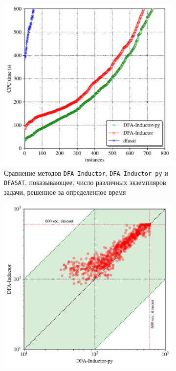 \begin{figure}[ht]
  \centering
  \begin{subfigure}[b]{0.48\textwidth}
    \centering
    \includegraphics[width=\textwidth]{img/lata19/plots/cactus}
    \caption{Сравнение методов \texttt{DFA-Inductor}, \texttt{DFA-Inductor-py} и \texttt{DFASAT}, показывающее, число различных экземпляров задачи, решенное за определенное время}
    \label{img:plots:cactus}
  \end{subfigure}%
  \;\;
  \begin{subfigure}[b]{0.48\textwidth}
    \centering
    \includegraphics[width=\textwidth]{img/lata19/plots/scatter}

\end{subfigure}
\end{figure}
